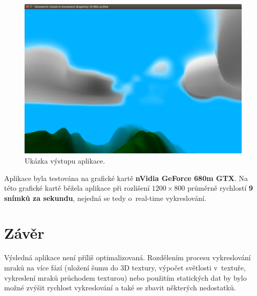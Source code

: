 \documentclass[a4paper, 12pt]{article}
\begin{document}
\begin{figure}
  \centering
  \includegraphics[width=15cm,keepaspectratio]{img/PGP-Clouds-01}
  \caption{Ukázka výstupu aplikace.}
  \label{fig:app-demo}
\end{figure}

Aplikace byla testována na grafické kartě \textbf{nVidia GeForce 680m GTX}.
Na této grafické kartě běžela aplikace při rozlišení $1200 \times 800$ průměrně
rychlostí \textbf{9 snímků za sekundu}, nejedná se tedy o~real-time vykreslování.


\section{Závěr}


Výsledná aplikace není příliš optimalizovaná. Rozdělením procesu vykreslování
mraků na více fází (uložení šumu do 3D textury, výpočet světlosti v~textuře,
vykreslení mraků průchodem texturou) nebo použitím statických dat by bylo možné
zvýšit rychlost vykreslování a také se zbavit některých nedostatků.

\nocite{url:clouds-wakapon}


\begin{flushleft}
  
\end{flushleft}

\end{document}

